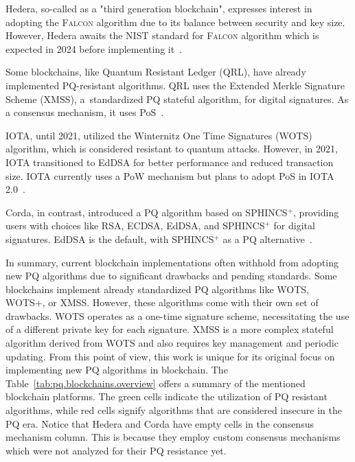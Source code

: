 Hedera, so-called as a "third generation blockchain", expresses interest in adopting the \textsc{Falcon} algorithm due to its balance between security and key size. However, Hedera awaits the NIST standard for \textsc{Falcon} algorithm which is expected in 2024 before implementing it~\cite{pq.blockchain.survey.10288193}.

Some blockchains, like Quantum Resistant Ledger (QRL), have already implemented PQ-resistant algorithms. QRL uses the Extended Merkle Signature Scheme (XMSS), a~standardized PQ stateful algorithm, for digital signatures. As a consensus mechanism, it uses PoS~\cite{pq.blockchain.survey.10288193}.

IOTA, until 2021, utilized the Winternitz One Time Signatures (WOTS) algorithm, which is considered resistant to quantum attacks. However, in 2021, IOTA transitioned to EdDSA for better performance and reduced transaction size. IOTA currently uses a PoW mechanism but plans to adopt PoS in IOTA 2.0~\cite{iota.web}.

Corda, in contrast, introduced a PQ algorithm based on SPHINCS$^+$, providing users with choices like RSA, ECDSA, EdDSA, and SPHINCS$^+$ for digital signatures. EdDSA is the default, with SPHINCS$^+$ as a PQ alternative~\cite{pq.blockchain.survey.10288193}.

In summary, current blockchain implementations often withhold from adopting new PQ algorithms due to significant drawbacks and pending standards. Some blockchains implement already standardized PQ algorithms like WOTS, WOTS+, or XMSS. However, these algorithms come with their own set of drawbacks. WOTS operates as a one-time signature scheme, necessitating the use of a different private key for each signature. XMSS is a more complex stateful algorithm derived from WOTS and also requires key management and periodic updating. From this point of view, this work is unique for its original focus on implementing new PQ algorithms in blockchain. The Table~\ref{tab:pq.blockchains.overview} offers a summary of the mentioned blockchain platforms. The green cells indicate the utilization of PQ resistant algorithms, while red cells signify algorithms that are considered insecure in the PQ era. Notice that Hedera and Corda have empty cells in the consensus mechanism column. This is because they employ custom consensus mechanisms which were not analyzed for their PQ resistance yet.


